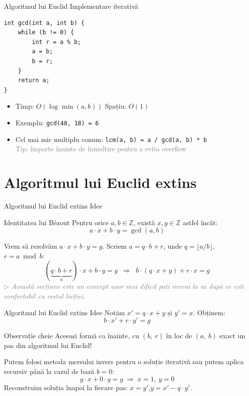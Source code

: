 \documentclass{beamer}
\begin{document}
\begin{frame}{Algoritmul lui Euclid \textemdash{} Implementare iterativă}
  \begin{center}
  \begin{lstlisting}
int gcd(int a, int b) {
    while (b != 0) {
        int r = a % b;
        a = b;
        b = r;
    }
    return a;
}
  \end{lstlisting}
  \end{center}
  \begin{itemize}
    \item Timp: $O(\log \min(a, b))$ \quad Spațiu: $O(1)$
    \item Exemplu: \lstinline[keepspaces=true]|gcd(48, 18) = 6|
    \item Cel mai mic multiplu comun: \lstinline[keepspaces=true]|lcm(a, b) = a / gcd(a, b) * b| \\
      {\footnotesize\textcolor{gray}{Tip: împarte înainte de înmulțire pentru a evita overflow}}
  \end{itemize}
\end{frame}

\section{Algoritmul lui Euclid extins}

\begin{frame}{Algoritmul lui Euclid extins \textemdash{} Idee}
  \begin{block}{Identitatea lui Bézout}
    Pentru orice $a, b \in \mathbb{Z}$, există $x, y \in \mathbb{Z}$ astfel încât:
    \[ a \cdot x + b \cdot y = \gcd(a, b) \]
  \end{block}
  \medskip
  Vrem să rezolvăm $a \cdot x + b \cdot y = g$. Scriem $a = q \cdot b + r$, unde $q = \lfloor a / b \rfloor$, $r = a \bmod b$:
  \[
    (\underbrace{q \cdot b + r}_{a}) \cdot x + b \cdot y = g
    \;\;\Rightarrow\;\;
    b \cdot (q \cdot x + y) + r \cdot x = g
  \]
  \vfill
  {\footnotesize\textcolor{gray}{\textit{$\triangleright$ Această secțiune este un concept ușor mai dificil \textemdash{} poți reveni la ea după ce ești confortabil cu restul lecției.}}}
\end{frame}

\begin{frame}{Algoritmul lui Euclid extins \textemdash{} Idee}
  Notăm $x' = q \cdot x + y$ și $y' = x$. Obținem:
  \[
    b \cdot x' + r \cdot y' = g
  \]
  \begin{block}{Observație cheie}
    Aceeași formă ca înainte, cu $(b,\ r)$ în loc de $(a,\ b)$ \textemdash{} exact un pas din algoritmul lui Euclid!
  \end{block}
  \medskip
  Putem folosi metoda mersului invers pentru o soluție iterativă sau putem aplica recursiv până la cazul de bază $b = 0$:
  \[
    g \cdot x + 0 \cdot y = g \;\Rightarrow\; x = 1,\ y = 0
  \]
  Reconstruim soluția înapoi la fiecare pas: $x = y'$,\quad $y = x' - q \cdot y'$.
\end{frame}
\end{document}
